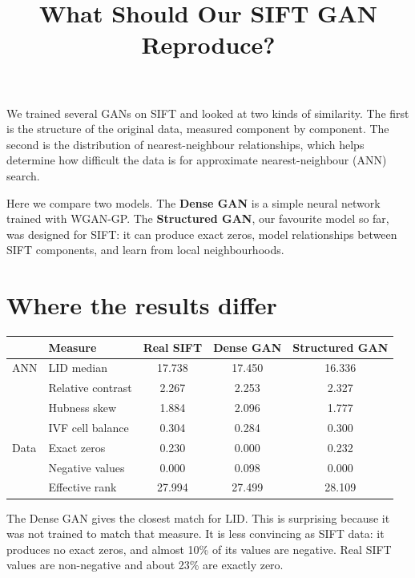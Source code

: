 \documentclass[10pt]{article}
\title{What Should Our SIFT GAN Reproduce?}
\author{}
\date{}
\begin{document}
\maketitle
\vspace{-2em}

We trained several GANs on SIFT and looked at two kinds of similarity.  The
first is the structure of the original data, measured component by component.
The second is the distribution of nearest-neighbour relationships, which helps
determine how difficult the data is for approximate nearest-neighbour (ANN)
search.

Here we compare two models.  The \textbf{Dense GAN} is a simple neural network
trained with WGAN-GP.  The \textbf{Structured GAN}, our favourite model so far,
was designed for SIFT: it can produce exact zeros, model relationships between
SIFT components, and learn from local neighbourhoods.

\section*{Where the results differ}

\begin{table}[h]
\centering
\small
\begin{tabular}{ll S[table-format=2.3] S[table-format=2.3] S[table-format=2.3]}
\toprule
& {Measure} & {Real SIFT} & {Dense GAN} & {Structured GAN} \\
\midrule
ANN & LID median             & 17.738 & 17.450 & 16.336 \\
    & Relative contrast      &  2.267 &  2.253 &  2.327 \\
    & Hubness skew           &  1.884 &  2.096 &  1.777 \\
    & IVF cell balance       &  0.304 &  0.284 &  0.300 \\
\midrule
Data & Exact zeros           &  0.230 &  0.000 &  0.232 \\
     & Negative values       &  0.000 &  0.098 &  0.000 \\
     & Effective rank        & 27.994 & 27.499 & 28.109 \\
\bottomrule
\end{tabular}
\end{table}

The Dense GAN gives the closest match for LID.  This is surprising because it
was not trained to match that measure.  It is less convincing as SIFT data: it
produces no exact zeros, and almost 10\% of its values are negative.  Real SIFT
values are non-negative and about 23\% are exactly zero.
\end{document}

